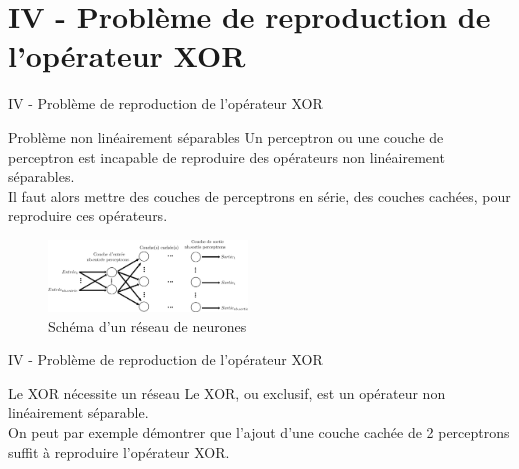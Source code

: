\documentclass[10pt]{beamer}
\begin{document}
\section{IV - Problème de reproduction de l'opérateur XOR}
\begin{frame}{IV - Problème de reproduction de l'opérateur XOR}
\begin{block}{Problème non linéairement séparables}
Un perceptron ou une couche de perceptron est incapable de reproduire des opérateurs non linéairement séparables. \\
Il faut alors mettre des couches de perceptrons en série, des couches cachées, pour reproduire ces opérateurs. \\
\end{block}
\begin{figure}
	\centering
    \includegraphics[width=200px]{1-Reseau.png}
	\caption{Schéma d'un réseau de neurones}
\end{figure}
\end{frame}

\begin{frame}{IV - Problème de reproduction de l'opérateur XOR}
\begin{block}{Le XOR nécessite un réseau}
Le XOR, ou exclusif, est un opérateur non linéairement séparable. \\
On peut par exemple démontrer que l'ajout d'une couche cachée de 2 perceptrons suffit à reproduire l'opérateur XOR. \\

\end{block}




\end{frame}
\end{document}
